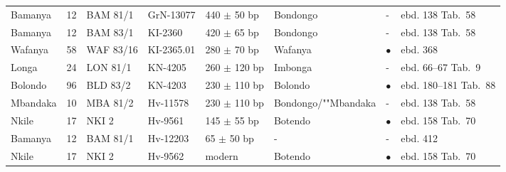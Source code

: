 \begin{footnotesize}
{\begin{longtable}{@{}P{.075\textwidth}P{.025\textwidth}P{.105\textwidth}P{.1\textwidth}P{.15\textwidth}P{.1\textwidth}P{.1\textwidth}P{.15\textwidth}@{}}
 Bamanya & 12 & BAM 81/1 & GrN-13077 & 440 \( \pm \) 50 bp & Bondongo & - & ebd. 138 Tab.~58 \\
 Bamanya & 12 & BAM 83/1 & KI-2360 & 420 \( \pm \) 65 bp & Bondongo & - & ebd. 138 Tab.~58 \\
 Wafanya & 58 & WAF 83/16 & KI-2365.01 & 280 \( \pm \) 70 bp & Wafanya & $\bullet $ & ebd. 368 \\
 Longa & 24 & LON 81/1 & KN-4205 & 260 \( \pm \) 120 bp & Imbonga & - & ebd. 66--67 Tab.~9 \\
 Bolondo & 96 & BLD 83/2 & KN-4203 & 230 \( \pm \) 110 bp & Bolondo & $\bullet $ & ebd. 180--181 Tab.~88 \\
 Mbandaka & 10 & MBA 81/2 & Hv-11578 & 230 \( \pm \) 110 bp & Bondongo/""Mbandaka & - & ebd. 138 Tab.~58 \\
 Nkile & 17 & NKI 2 & Hv-9561 & 145 \( \pm \) 55 bp & Botendo & $\bullet $ & ebd. 158 Tab.~70 \\
 Bamanya & 12 & BAM 81/1 & Hv-12203 & 65 \( \pm \) 50 bp & - & - & ebd. 412 \\
 Nkile & 17 & NKI 2 & Hv-9562 & modern & Botendo & $\bullet $ & ebd. 158 Tab.~70 \\
\end{longtable}
}
\end{footnotesize}